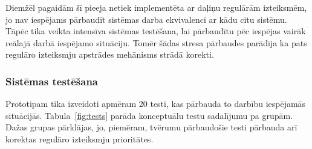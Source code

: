 Diemžēl pagaidām šī pieeja netiek implementēta ar daļiņu regulārām izteiksmēm, jo nav iespējams pārbaudīt sistēmas darba ekvivalenci ar kādu citu sistēmu. Tāpēc tika veikta intensīva sistēmas testēšana, lai pārbaudītu pēc iespējas vairāk reālajā darbā iespējamo situāciju. Tomēr šādas stresa pārbaudes parādīja ka pats regulāro izteiksmju apstrādes mehānisms strādā korekti.

\subsubsection{Sistēmas testēšana}

Prototipam tika izveidoti apmēram 20 testi, kas pārbauda to darbību iespējamās situācijās. Tabula~\ref{fig:tests} parāda konceptuālu testu sadalījumu pa grupām. Dažas grupas pārklājas, jo, piemēram, tvērumu pārbaudošie testi pārbauda arī korektas regulāro izteiksmju prioritātes.

